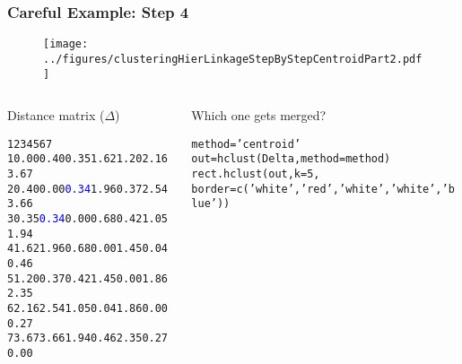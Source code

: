 \documentclass{beamer}
\begin{document}
\begin{frame}[fragile]
\frametitle{Careful Example: Step 4}

\begin{figure}[h!]
  \centering
  \texttt{[image: ../figures/clusteringHierLinkageStepByStepCentroidPart2.pdf]}
\end{figure}

\begin{columns}[T]
\begin{column}{.45\textwidth}
Distance matrix ($\Delta$)
\tiny
\begin{alltt}
     1    2    3    4    5    6    7
1 0.00 0.40 0.35 1.62 1.20 2.16 3.67
2 0.40 0.00 \textcolor{blue}{0.34} 1.96 0.37 2.54 3.66
3 0.35 \textcolor{blue}{0.34} 0.00 0.68 0.42 1.05 1.94
4 1.62 1.96 0.68 0.00 1.45 0.04 0.46
5 1.20 0.37 0.42 1.45 0.00 1.86 2.35
6 2.16 2.54 1.05 0.04 1.86 0.00 0.27
7 3.67 3.66 1.94 0.46 2.35 0.27 0.00
\end{alltt}
\end{column}
\begin{column}{.55\textwidth}
Which one gets merged?
\pause

\pause
\tiny
\begin{alltt}
method = 'centroid'
out = hclust(Delta,method=method)
rect.hclust(out,k=5,
            border=c('white','red','white','white','blue'))
\end{alltt}
\end{column}
\end{columns}
\end{frame}

%
%
%
\end{document}

